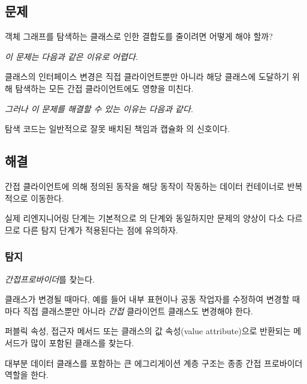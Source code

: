 \documentclass[a4paper,10pt,twoside]{book}
\begin{document}
\subsection*{문제}

객체 그래프를 탐색하는 클래스로 인한 결합도를 줄이려면 어떻게 해야 할까?

\emph{이 문제는 다음과 같은 이유로 어렵다.} 

\begin{bulletlist}
\item 클래스의 인터페이스 변경은 직접 클라이언트뿐만 아니라 해당 클래스에 도달하기 위해 탐색하는 모든 간접 클라이언트에도 영향을 미친다.
\end{bulletlist}

\emph{그러나 이 문제를 해결할 수 있는 이유는 다음과 같다.}

\begin{bulletlist}
\item 탐색 코드는 일반적으로 잘못 배치된 책임과 캡슐화 의 신호이다.
\end{bulletlist}

\subsection*{해결}

간접 클라이언트에 의해 정의된 동작을 해당 동작이 작동하는 데이터 컨테이너로 반복적으로 이동한다.

실제 리엔지니어링 단계는 기본적으로 의 단계와 동일하지만 문제의 양상이 다소 다르므로 다른 탐지 단계가 적용된다는 점에 유의하자.

\subsubsection*{탐지}

\emph{간접프로바이더}를 찾는다.

\begin{bulletlist}
\item 클래스가 변경될 때마다, 예를 들어 내부 표현이나 공동 작업자를 수정하여 변경할 때마다 직접 클래스뿐만 아니라 \emph{간접} 클라이언트 클래스도 변경해야 한다.

\item 퍼블릭 속성, 접근자 메서드 또는 클래스의 값 속성(value attribute)으로 반환되는 메서드가 많이 포함된 클래스를 찾는다.

\item 대부분 데이터 클래스를 포함하는 큰 에그리게이션 계층 구조는 종종 간접 프로바이더 역할을 한다.
\end{bulletlist}
\end{document}
